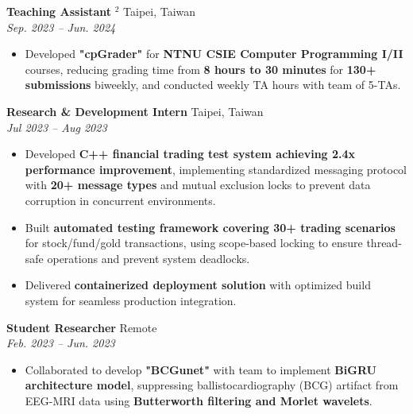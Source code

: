 \documentclass[a4paper,11pt]{article}
\begin{document}
\noindent \textbf{Teaching Assistant} \hyperlink{award2}{\color{textcolor}\raisebox{0pt}{}$^{2}$} \hfill Taipei, Taiwan\\
 \hfill \textit{Sep. 2023 -- Jun. 2024}
\begin{itemize}
    \item Developed \textbf{"cpGrader"} \href{https://github.com/ryanlinjui/cpGrader}{\color{textcolor}\raisebox{0pt}{}} for \textbf{NTNU CSIE Computer Programming I/II} courses, reducing grading time from \textbf{8 hours to 30 minutes} for \textbf{130+ submissions} biweekly, and conducted weekly TA hours with team of 5-TAs.
\end{itemize}
\vspace{0.25em}

\noindent \textbf{Research \& Development Intern} \hfill Taipei, Taiwan\\
 \hfill \textit{Jul 2023 -- Aug 2023}
\begin{itemize}
    \item Developed \textbf{C++ financial trading test system achieving 2.4x performance improvement}, implementing standardized messaging protocol with \textbf{20+ message types} and mutual exclusion locks to prevent data corruption in concurrent environments.
    \item Built \textbf{automated testing framework covering 30+ trading scenarios} for stock/fund/gold transactions, using scope-based locking to ensure thread-safe operations and prevent system deadlocks.
    \item Delivered \textbf{containerized deployment solution} with optimized build system for seamless production integration.
\end{itemize}
\vspace{0.25em}

\noindent \textbf{Student Researcher} \hfill Remote\\
 \hfill \textit{Feb. 2023 -- Jun. 2023}
\begin{itemize}
    \item Collaborated to develop \textbf{"BCGunet"} \href{https://github.com/fahsuanlin/BCGunet}{\color{textcolor}\raisebox{0pt}{}} with team to implement \textbf{BiGRU architecture model}, suppressing ballistocardiography (BCG) artifact from EEG-MRI data using \textbf{Butterworth filtering and Morlet wavelets}. %
\end{itemize}
\end{document}
